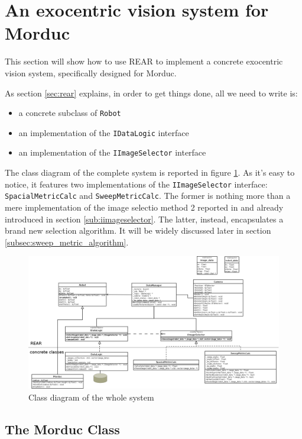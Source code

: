 \section{An exocentric vision system for Morduc}
\label{sec:concr}
This section will show how to use \textsf{REAR} to implement a 
concrete exocentric vision system, specifically designed for 
Morduc.
%

%
As section \ref{sec:rear} explains, in order to get things 
done, all we need to write is:
\begin{itemize}
\item a concrete subclass of \texttt{Robot}
\item an implementation of the \texttt{IDataLogic} interface
\item an implementation of the \texttt{IImageSelector} interface
\end{itemize}
%
The class diagram of the complete system is reported in figure 
\ref{fig:class_diagram_complete}. 
%
As it's easy to notice, it features two implementations 
of the \texttt{IImageSelector} interface: \texttt{SpacialMetricCalc} 
and \texttt{SweepMetricCalc}. The former is nothing more than 
a mere implementation of the image selectio method 2 reported in 
\cite{sugimoto} and already introduced in section \ref{sub:iimageselector}.
%
The latter, instead, encapsulates a brand new selection algorithm. 
It will be widely discussed later in section 
\ref{subsec:sweep_metric_algorithm}.
%
\begin{figure}[!h]
  \begin{center}
    \includegraphics[width=420pt]{img/class_diagram.png} 
    \caption{Class diagram of the whole system}
    \label{fig:class_diagram_complete}
  \end{center}
\end{figure}
%
\subsection{The Morduc Class}





